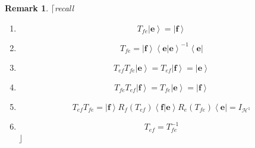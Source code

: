 \documentclass[aps,preprint]{revtex4}%
\newtheorem{remark}[theorem]{Remark}
\begin{document}
\begin{remark}
$\lceil$recall

\begin{enumerate}
\item
\begin{equation}
T_{fe}\left\vert \mathbf{e}\right\rangle =\left\vert \mathbf{f}\right\rangle
\end{equation}


\item
\begin{equation}
T_{fe}=\left\vert \mathbf{f}\right\rangle \left\langle \left.  \mathbf{e}%
\right\vert \mathbf{e}\right\rangle ^{-1}\left\langle \mathbf{e}\right\vert
\end{equation}


\item
\begin{equation}
T_{ef}T_{fe}\left\vert \mathbf{e}\right\rangle =T_{ef}\left\vert
\mathbf{f}\right\rangle =\left\vert \mathbf{e}\right\rangle
\end{equation}


\item
\begin{equation}
T_{fe}T_{ef}\left\vert \mathbf{f}\right\rangle =T_{fe}\left\vert
\mathbf{e}\right\rangle =\left\vert \mathbf{f}\right\rangle
\end{equation}


\item
\begin{equation}
T_{ef}T_{fe}=\left\vert \mathbf{f}\right\rangle R_{f}\left(  T_{ef}\right)
\left\langle \left.  \mathbf{f}\right\vert \mathbf{e}\right\rangle
R_{e}\left(  T_{fe}\right)  \left\langle \mathbf{e}\right\vert =I_{\mathcal{H}%
^{1}}%
\end{equation}


\item
\begin{equation}
T_{ef}=T_{fe}^{-1}%
\end{equation}
$\rfloor$
\end{enumerate}
\end{remark}
\end{document}
